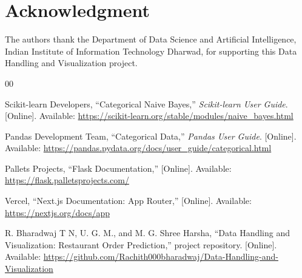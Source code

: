 \documentclass[conference]{IEEEtran}
\begin{document}
\section*{Acknowledgment}

The authors thank the Department of Data Science and Artificial Intelligence, Indian Institute of Information Technology Dharwad, for supporting this Data Handling and Visualization project.

\begin{thebibliography}{00}

Scikit-learn Developers, ``Categorical Naive Bayes,'' \textit{Scikit-learn User Guide}. [Online]. Available: \url{https://scikit-learn.org/stable/modules/naive_bayes.html}

Pandas Development Team, ``Categorical Data,'' \textit{Pandas User Guide}. [Online]. Available: \url{https://pandas.pydata.org/docs/user_guide/categorical.html}

Pallets Projects, ``Flask Documentation,'' [Online]. Available: \url{https://flask.palletsprojects.com/}

Vercel, ``Next.js Documentation: App Router,'' [Online]. Available: \url{https://nextjs.org/docs/app}

R. Bharadwaj T N, U. G. M., and M. G. Shree Harsha, ``Data Handling and Visualization: Restaurant Order Prediction,'' project repository. [Online]. Available: \url{https://github.com/Rachith000bharadwaj/Data-Handling-and-Visualization}

\end{thebibliography}
\end{document}

